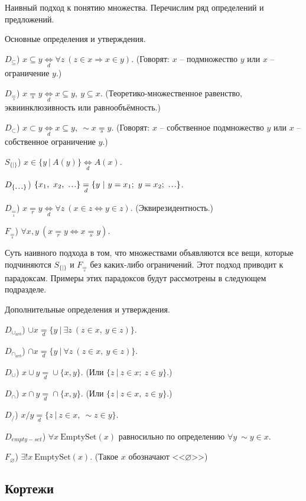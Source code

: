 \documentclass[a4paper]{article}
\newcommand\mydots{\hbox to 1em{.\hss.\hss.}}
\newcommand{\Def}[0]{\underset{d}{\Leftrightarrow}}
\newcommand{\defeq}[0]{\underset{d}{=}}
\newcommand{\eqi}[0]{\underset{i}{=}} %
\newcommand{\eqs}[0]{\underset{s}{=}} %
\newcommand{\eqr}[0]{\underset{r}{=}} %
\newcommand{\EmptySet}[1]{\mathrm{EmptySet}(#1)}
\begin{document}
Наивный подход к понятию множества. Перечислим ряд определений и предложений.

\bigskip

Основные определения и утверждения.

$D_{\subseteq}$) $x \subseteq y \Def \forall z~ (z \in x \Rightarrow x \in y)$. (Говорят: $x$ -- подмножество $y$ или $x$ -- ограничение $y$.)

$D_{\eqs}$) $x \eqs y \Def x \subseteq y,~ y \subseteq x$. (Теоретико-множественное равенство, эквиинклюзивность или равнообъёмность.)

$D_{\subset}$) $x \subset y \Def x \subseteq y,~ \sim x \eqs y$. (Говорят: $x$ -- собственное подмножество $y$ или $x$ -- собственное ограничение $y$.)

$S_{\{ | \}}$) $x \in \{ y ~|~  A(y) \} \Def A(x)$.

$D_{\{ \mydots \}}$) $\{ x_1,~ x_2,~ \mydots \} \defeq \{ y ~|~ y = x_1;~ y = x_2;~ \mydots \}$.

$D_{\eqi}$) $x \eqr y \Def \forall z~ (x \in z \Leftrightarrow y \in z)$. (Эквирезидентность.)

$F_{\eqs}$) $\forall x, y~ (x \eqr y \Leftrightarrow x \eqs y)$.

\bigskip

Суть наивного подхода в том, что множествами объявляются все вещи, которые подчиняются $S_{\{ | \}}$ и $F_{\eqs}$ без каких-либо ограничений. Этот подход приводит к парадоксам. Примеры этих парадоксов будут рассмотрены в следующем подразделе.

\bigskip

Дополнительные определения и утверждения.

$D_{\cup_{arb}}$) $\cup x \defeq \{ y ~|~ \exists z~ (z \in x,~ y \in z) \}$.

$D_{\cap_{arb}}$) $\cap x \defeq \{ y ~|~ \forall z~ (z \in x,~ y \in z) \}$.

$D_{\cup}$) $x \cup y \defeq \cup \{ x, y \}$. (Или $\{ z ~|~ z \in x;~ z \in y \}$.)

$D_{\cap}$) $x \cap y \defeq \cap \{ x, y \}$. (Или $\{ z ~|~ z \in x,~ z \in y \}$.)

$D_{/}$) $x / y \defeq \{ z ~|~ z \in x,~ \sim z \in y \}$.

$D_{empty-set}$) $\forall x~ \EmptySet{x}$ равносильно по определению $\forall y~ \sim y \in x$.

$F_{\varnothing}$) $\exists! x~ \EmptySet{x}$. (Такое $x$ обозначают <<$\varnothing$>>)

\subsection{Кортежи}
\end{document}
